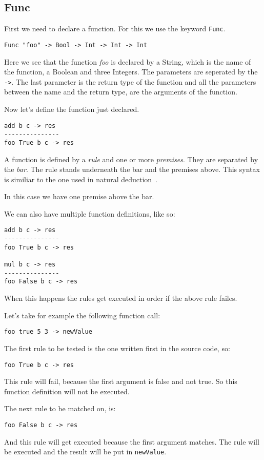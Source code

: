\subsection{Func}
First we need to declare a function.
For this we use the keyword \verb|Func|.

\begin{lstlisting}
Func "foo" -> Bool -> Int -> Int -> Int
\end{lstlisting}

Here we see that the function \emph{foo} is declared by a String, which is the name of the function, a Boolean and three Integers.
The parameters are seperated by the \verb|->|.
The last parameter is the return type of the function and all the parameters between the name and the return type, are the arguments of the function.

Now let's define the function just declared.
\begin{lstlisting}
add b c -> res
---------------
foo True b c -> res
\end{lstlisting}

A function is defined by a \emph{rule} and one or more \emph{premises}.
They are separated by the \emph{bar}.
The rule stands underneath the bar and the premises above.
This syntax is similiar to the one used in natural deduction~\cite{}.

In this case we have one premise above the bar.

We can also have multiple function definitions, like so:
\begin{lstlisting}
add b c -> res
---------------
foo True b c -> res

mul b c -> res
---------------
foo False b c -> res
\end{lstlisting}

When this happens the rules get executed in order if the above rule failes.

Let's take for example the following function call:
\begin{lstlisting}
foo true 5 3 -> newValue
\end{lstlisting}

The first rule to be tested is the one written first in the source code, so:
\begin{lstlisting}
foo True b c -> res
\end{lstlisting}
This rule will fail, because the first argument is false and not true.
So this function definition will not be executed.

The next rule to be matched on, is:
\begin{lstlisting}
foo False b c -> res
\end{lstlisting}
And this rule will get executed because the first argument matches.
The rule will be executed and the result will be put in \verb|newValue|.


